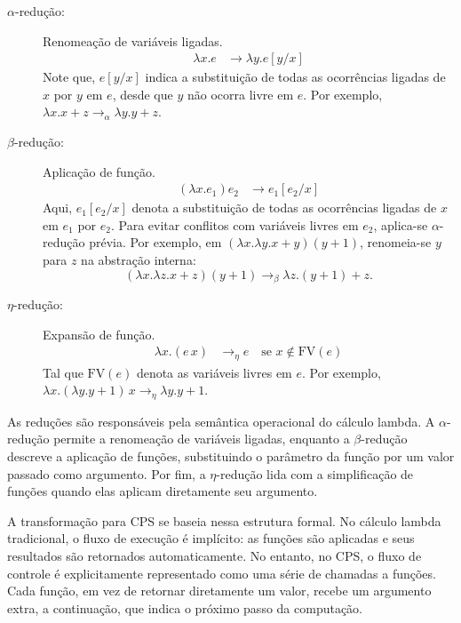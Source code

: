 \begin{description}
  \item[$\alpha$-redução:] Renomeação de variáveis ligadas.
        \begin{align}
          \lambda x . e & \rightarrow \lambda y . e[y/x]\label{eq:alpha-reduction}
        \end{align}
        Note que, $e[y/x]$ indica a substituição de todas as ocorrências ligadas de $x$ por $y$ em $e$, desde que $y$ não ocorra livre em $e$. Por exemplo, $\lambda x. x + z \rightarrow_\alpha \lambda y. y + z$.

  \item[$\beta$-redução:] Aplicação de função.
        \begin{align}
          (\lambda x . e_1) e_2 & \rightarrow e_1 [e_2 / x]\label{eq:beta-reduction}
        \end{align}
        Aqui, $e_1[e_2/x]$ denota a substituição de todas as ocorrências ligadas de $x$ em $e_1$ por $e_2$. Para evitar conflitos com variáveis livres em $e_2$, aplica-se $\alpha$-redução prévia. Por exemplo, em $(\lambda x. \lambda y. x + y)(y + 1)$, renomeia-se $y$ para $z$ na abstração interna:
        \[
          (\lambda x. \lambda z. x + z)(y + 1) \rightarrow_\beta \lambda z. (y + 1) + z.
        \]

  \item[$\eta$-redução:] Expansão de função.
        \begin{align}
          \lambda x . (e \, x) & \rightarrow_\eta e \quad \text{se } x \notin \text{FV}(e)\label{eq:eta-reduction}
        \end{align}
        Tal que $\text{FV}(e)$ denota as variáveis livres em $e$. Por exemplo, $\lambda x. (\lambda y. y + 1) \, x \rightarrow_\eta \lambda y. y + 1$.
\end{description}

As reduções são responsáveis pela semântica operacional do cálculo lambda.
A $\alpha$-redução permite a renomeação de variáveis ligadas, enquanto a $\beta$-redução descreve a aplicação de funções, substituindo o parâmetro da função por um valor passado como argumento.
Por fim, a $\eta$-redução lida com a simplificação de funções quando elas aplicam diretamente seu argumento.

A transformação para CPS se baseia nessa estrutura formal.
No cálculo lambda tradicional, o fluxo de execução é implícito: as funções são aplicadas e seus resultados são retornados automaticamente.
No entanto, no CPS, o fluxo de controle é explicitamente representado como uma série de chamadas a funções.
Cada função, em vez de retornar diretamente um valor, recebe um argumento extra, a continuação, que indica o próximo passo da computação.

